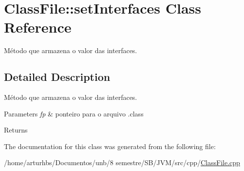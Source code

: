 \hypertarget{classClassFile_1_1setInterfaces}{}\section{Class\+File\+:\+:set\+Interfaces Class Reference}
\label{classClassFile_1_1setInterfaces}


Método que armazena o valor das interfaces.  




\subsection{Detailed Description}
Método que armazena o valor das interfaces. 


\begin{DoxyParams}{Parameters}
{\em fp} & ponteiro para o arquivo .class \\
\hline
\end{DoxyParams}
\begin{DoxyReturn}{Returns}

\end{DoxyReturn}


The documentation for this class was generated from the following file\+:\begin{DoxyCompactItemize}
\item 
/home/arturhbs/\+Documentos/unb/8 semestre/\+S\+B/\+J\+V\+M/src/cpp/\hyperlink{ClassFile_8cpp}{Class\+File.\+cpp}\end{DoxyCompactItemize}
